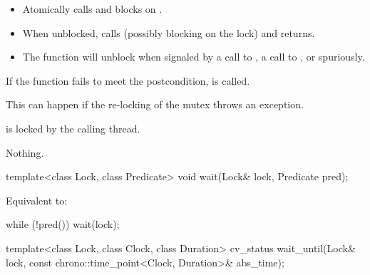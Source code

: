 \begin{itemdescr}
\pnum
{}%
\effects
\begin{itemize}
\item Atomically calls  and blocks on .
\item When unblocked, calls  (possibly blocking on the lock) and returns.
\item The function will unblock when signaled by a call to ,
a call to , or spuriously.
\end{itemize}

\pnum
\remarks
If the function fails to meet the postcondition, 
is called.
\begin{note}
This can happen if the re-locking of the mutex throws an exception.
\end{note}

\pnum
\ensures
{} is locked by the calling thread.

\pnum
\throws
Nothing.
\end{itemdescr}

%
\begin{itemdecl}
template<class Lock, class Predicate>
  void wait(Lock& lock, Predicate pred);
\end{itemdecl}

\begin{itemdescr}
\pnum
\effects
Equivalent to:
\begin{codeblock}
while (!pred())
  wait(lock);
\end{codeblock}
\end{itemdescr}

%
\begin{itemdecl}
template<class Lock, class Clock, class Duration>
  cv_status wait_until(Lock& lock, const chrono::time_point<Clock, Duration>& abs_time);
\end{itemdecl}

